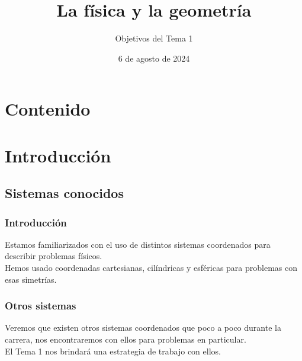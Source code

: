 \documentclass[12pt]{beamer}
\date{6 de agosto de 2024}
\title{La física y la geometría}
\subtitle{Objetivos del Tema 1}
\begin{document}
\maketitle
\fontsize{14}{14}\selectfont
{}

\section*{Contenido}

\section{Introducción}
\subsection{Sistemas conocidos}

\begin{frame}
\frametitle{Introducción}
Estamos familiarizados con el uso de distintos sistemas coordenados para describir problemas físicos.
\\
\bigskip
\pause
Hemos usado coordenadas cartesianas, cilíndricas y esféricas para problemas con esas simetrías.
\end{frame}
\begin{frame}
\frametitle{Otros sistemas}
Veremos que existen otros sistemas coordenados que poco a poco durante la carrera, nos encontraremos con ellos para problemas en particular.
\\
\bigskip
\pause
El Tema 1 nos brindará una estrategia de trabajo con ellos.
\end{frame}

\end{document}
